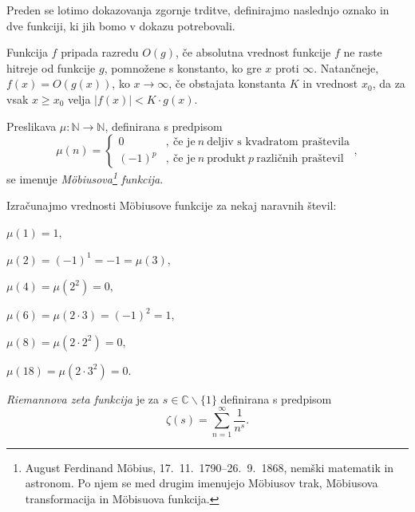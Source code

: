 \documentclass[mat1]{fmfdelo}
\begin{document}
%
Preden se lotimo dokazovanja zgornje trditve, definirajmo naslednjo oznako in dve funkciji, ki jih bomo v dokazu potrebovali.

\begin{definicija}
Funkcija $f$ pripada razredu $O(g)$, če absolutna vrednost funkcije $f$ ne raste hitreje od funkcije $g$, pomnožene s konstanto, ko gre $x$ proti $\infty$.
Natančneje, $f(x) = O \left(g(x) \right)$, ko $x \to \infty$, če obstajata konstanta $K$ in vrednost $x_{0}$, da za vsak $x \geq x_{0}$ velja $|f(x)| < K \cdot g(x)$.
\end{definicija}

\begin{definicija}
\label{def:MobFun}
Preslikava \( \mu\colon \mathbb{N} \to \mathbb{N} \), definirana s predpisom
\begin{equation}
\mu(n) = \left\{
\begin{array}{rl}
0 &,\ \textrm{če je}\ n\ \textrm{deljiv s kvadratom praštevila}\\
(-1)^p &,\ \textrm{če je}\ n\ \textrm{produkt}\ p\ \textrm{različnih praštevil}
\end{array},
\right.
\end{equation}
se imenuje \emph{M\"obiusova\footnote{August Ferdinand M\"obius, 17.\ 11.\ 1790--26.\ 9.\ 1868, nemški matematik in astronom. Po njem se med drugim imenujejo M\"obiusov trak, M\"obiusova transformacija in M\"obisuova funkcija.} funkcija}.
\end{definicija}

\begin{primer}
Izračunajmo vrednosti M\"obiusove funkcije za nekaj naravnih števil:

\( \mu(1)=1, \)

\( \mu(2)=(-1)^{1}=-1=\mu(3), \)

\( \mu(4)=\mu(2^{2})=0, \)

\( \mu(6)=\mu(2\cdot3)=(-1)^{2}=1, \)

\( \mu(8)=\mu(2\cdot2^{2})=0, \)

\( \mu(18)=\mu(2\cdot3^{2})=0. \)
\end{primer}

\begin{definicija}
\label{def:RiemZeta}
\emph{Riemannova zeta funkcija} je za
 $s\in\mathbb{C}\backslash\{1\}$
definirana s predpisom
\begin{equation}
\zeta(s) = \sum_{n=1}^{\infty}\frac{1}{n^s}.
\end{equation}
\end{definicija}
\end{document}
